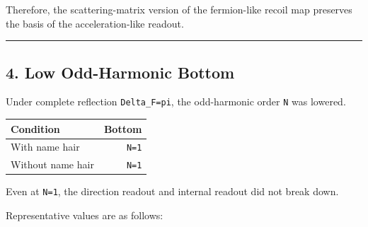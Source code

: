 \documentclass[
]{article}
\newcounter{none} %
\begin{document}
Therefore, the scattering-matrix version of the fermion-like recoil map
preserves the basis of the acceleration-like readout.

\begin{center}\rule{0.5\linewidth}{0.5pt}\end{center}

\subsection{4. Low Odd-Harmonic Bottom}\label{low-odd-harmonic-bottom}

Under complete reflection \texttt{Delta\_F=pi}, the odd-harmonic order
\texttt{N} was lowered.

{\def\LTcaptype{none} %
\begin{longtable}[]{@{}lr@{}}
\toprule\noalign{}
Condition & Bottom \\
\midrule\noalign{}
\endhead
\bottomrule\noalign{}
\endlastfoot
With name hair & \texttt{N=1} \\
Without name hair & \texttt{N=1} \\
\end{longtable}
}

Even at \texttt{N=1}, the direction readout and internal readout did not
break down.

Representative values are as follows:
\end{document}
